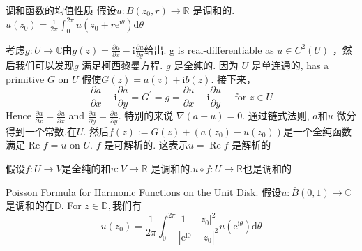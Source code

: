 \documentclass[cn,11pt,chinese,black]{elegantbook}
\begin{document}
	\begin{theorem}{调和函数的均值性质}
		\noindent 假设$u: B\left(z_{0}, r\right) \rightarrow \mathbb{R}$ 是调和的. 
		$u\left(z_{0}\right)=\frac{1}{2 \pi} \int_{0}^{2 \pi} u\left(z_{0}+r \mathrm{e}^{\mathrm{i} \theta}\right) \mathrm{d} \theta$
	\end{theorem}
	\noindent 考虑$g: U \rightarrow \mathbb{C}$由$g(z)=\frac{\partial u}{\partial x}-\mathrm{i} \frac{\partial u}{\partial y}$给出. g is real-differentiable as $u \in C^{2}(U)$ ，然后我们可以发现$g$ 满足柯西黎曼方程.  $g$ 是全纯的. 因为 $U$ 是单连通的,  has a primitive $G$ on $U$
	假使$G(z)=a(z)+\mathrm{i} b(z) .$ 接下来，
	$$
	\frac{\partial a}{\partial x}-\mathrm{i} \frac{\partial a}{\partial y}=G^{\prime}=g=\frac{\partial u}{\partial x}-\mathrm{i} \frac{\partial u}{\partial y} \quad \text { for } z \in U
	$$
	Hence $\frac{\partial a}{\partial x}=\frac{\partial u}{\partial x}$ and $\frac{\partial a}{\partial y}=\frac{\partial u}{\partial y} .$ 特别的来说 $\nabla(a-u)=0 .$ 通过链式法则, $a$和$u$ 微分得到一个常数.在$U .$ 然后$f(z):=G(z)+\left(a\left(z_{0}\right)-u\left(z_{0}\right)\right)$是一个全纯函数满足 Re $f=u$ on $U .$ $f$ 是可解析的. 这表示$u=\operatorname{Re} f$ 是解析的
	\begin{lemma}
		\noindent 假设$f: U \rightarrow V$是全纯的和$u: V \rightarrow \mathbb{R}$ 是调和的.$u \circ f: U \rightarrow \mathbb{R}$也是调和的
	\end{lemma}
	\begin{theorem}{Poisson Formula for Harmonic Functions on the Unit Disk.}
		\noindent 假设$u: \bar{B}(0,1) \rightarrow \mathbb{C}$ 是调和的在$\mathbb{D} .$ For $z \in \mathbb{D},$我们有
		\[
		u\left(z_{0}\right)=\frac{1}{2 \pi} \int_{0}^{2 \pi} \frac{1-\left|z_{0}\right|^{2}}{\left|\mathrm{e}^{\mathrm{i} 0}-z_{0}\right|^{2}} u\left(\mathrm{e}^{\mathrm{i} \theta}\right) \mathrm{d} \theta
		\]
	\end{theorem}
\end{document}
